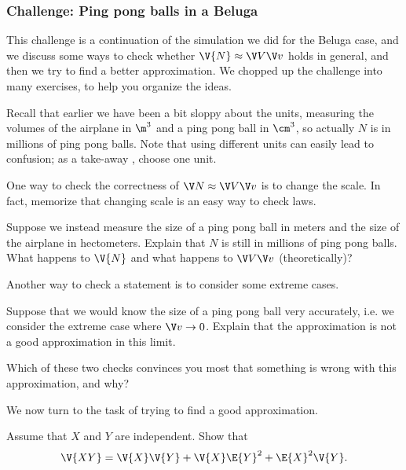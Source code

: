 \subsubsection{Challenge: Ping pong balls in a Beluga}

This challenge is a continuation of the simulation we did for the Beluga case, and we discuss some ways to check whether $\V {N} \approx \V V \V v$ holds in general, and then we try to find a better approximation. We chopped up the challenge into many exercises, to help you organize the ideas.


Recall that earlier we have been a bit sloppy about the units, measuring the volumes of the airplane in $\m^{3}$ and a ping pong ball in $\cm^{3}$, so actually $N$ is in millions of ping pong balls.
Note that using different units can easily lead to  confusion; as a take-away , choose one unit.

One way to check the correctness of $\V N \approx \V V \V v$ is to change the scale. In fact, memorize that changing scale is an easy way to check laws.

\begin{exercise}
Suppose we instead measure the size of a ping pong ball in meters and the size of the airplane in hectometers.
Explain that $N$ is still in millions of ping pong balls.
What happens to $\V{N}$ and what happens to $\V V \V v$ (theoretically)?
\end{exercise}


Another way to check a statement is to consider some extreme cases.

\begin{exercise} Suppose that we would know the size of a ping pong ball very accurately, i.e.  we consider the extreme case where $\V v \rightarrow 0$. Explain that the approximation is not a good approximation in this limit.
\end{exercise}


\begin{exercise}
Which of these two checks convinces you most that something is wrong with this approximation, and why?
\end{exercise}

We now turn to the task of trying to find a good approximation.

\begin{exercise} Assume that $X$ and $Y$ are independent. Show that
\begin{equation*}
\V {X Y} = \V {X} \V {Y} + \V{X} \E {Y}^2 + \E {X}^2 \V{Y}.
\end{equation*}
\end{exercise}


